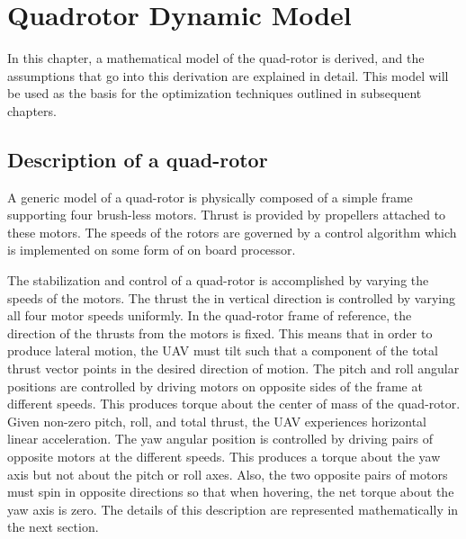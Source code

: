 
\chapter{Quadrotor Dynamic Model} %

\label{Chapter3} %



In this chapter, a mathematical model of the quad-rotor is derived, and the assumptions that go into this derivation are explained in detail. This model will be used as the basis for the optimization techniques outlined in subsequent chapters.

\section{Description of a quad-rotor}

A generic model of a quad-rotor is physically composed of a simple frame supporting four brush-less motors. Thrust is provided by propellers attached to these motors. The speeds of the rotors are governed by a control algorithm which is implemented on some form of on board processor.

 The stabilization and control of a quad-rotor is accomplished by varying the speeds of the motors. The thrust the in vertical direction is controlled by varying all four motor speeds uniformly. In the quad-rotor frame of reference, the direction of the thrusts from the motors is fixed. This means that in order to produce lateral motion, the UAV must tilt such that a component of the total thrust vector points in the desired direction of motion. The pitch and roll angular positions are controlled by driving motors on opposite sides of the frame at different speeds. This produces torque about the center of mass of the quad-rotor. Given non-zero pitch, roll, and total thrust, the UAV experiences horizontal linear acceleration. The yaw angular position is controlled by driving pairs of opposite motors at the different speeds. This produces a torque about the yaw axis but not about the pitch or roll axes. Also, the two opposite pairs of motors must spin in opposite directions so that when hovering, the net torque about the yaw axis is zero. The details of this description are represented mathematically in the next section.



